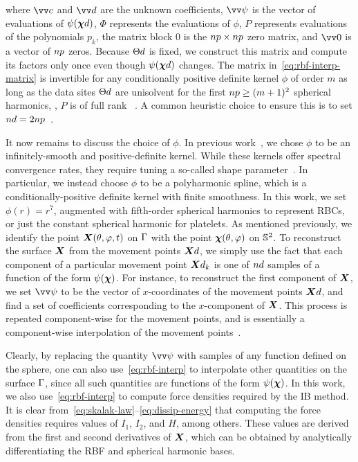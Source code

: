 where $\arr{c}$ and $\arr{d}$ are the unknown coefficients, $\arr{\psi}$ is the vector of evaluations of $\psi(\data\Xp)$, $\Phi$ represents the evaluations of $\phi$, $P$
represents evaluations of the polynomials $p_k$, the matrix block $0$ is the
$\poly\cardinality\times\poly\cardinality$ zero matrix, and $\arr{0}$ is a vector of $\poly\cardinality$ zeros.
Because $\data\sites$ is fixed, we construct this matrix and compute its factors only once even though $\psi(\data\Xp)$
changes. The matrix in~\eqref{eq:rbf-interp-matrix} is invertible for any conditionally positive definite kernel
$\phi$ of order $m$ as long as the data sites $\data\sites$ are unisolvent for the first
$\poly\cardinality \ge (m+1)^2$ spherical harmonics, , $P$ is of full rank~ \cite{Fasshauer:2007ui}. A
common heuristic choice to ensure this is to set $\data\cardinality = 2 \poly\cardinality$~\cite{SWJCP2018}.

It now remains to discuss the choice of $\phi$. In previous work~\cite{Shankar:2015km}, we chose $\phi$ to be an
infinitely-smooth and positive-definite kernel. While these kernels offer spectral convergence rates, they require
tuning a so-called shape parameter~\cite{Fasshauer:2007ui}. In particular, we instead choose $\phi$ to be a
polyharmonic spline, which is a conditionally-positive definite kernel with finite smoothness. In this work,
we set $\phi(r) = r^7$, augmented with fifth-order spherical harmonics to represent RBCs, or just the constant
spherical harmonic for platelets. As mentioned previously, we identify the point $\boldsymbol{X}(\theta, \varphi, t)$ on
$\Gamma$ with the point $\boldsymbol{\chi}(\theta, \varphi)$ on $\mathbb{S}^2$.  To reconstruct the surface $\boldsymbol{X}$ from the
movement points $\data\X$, we simply use the fact that each component of a particular movement point $\data\X_k$
is one of $\data\cardinality$ samples of a function of the form $\psi(\boldsymbol{\chi})$. For instance, to reconstruct the
first component of $\boldsymbol{X}$, we set $\arr{\psi}$ to be the vector of $x$-coordinates of the movement
points $\data\X$, and find a set of coefficients corresponding to the $x$-component of $\boldsymbol{X}$.  This process is
repeated component-wise for the movement points, and is essentially a component-wise interpolation of the movement
points~\cite{Shankar:2015km}.

Clearly, by replacing the quantity $\arr{\psi}$ with samples of any function defined on the sphere, one can also
use~\eqref{eq:rbf-interp} to interpolate other quantities on the surface $\Gamma$, since all such quantities
are functions of the form $\psi(\boldsymbol{\chi})$. In this work, we also use~\eqref{eq:rbf-interp} to compute force densities
required by the IB method. It is clear from~\eqref{eq:skalak-law}--\eqref{eq:dissip-energy} that computing the
force densities requires values of $I_1$, $I_2$, and $H$, among others.  These values are derived from the first
and second derivatives of $\boldsymbol{X}$, which can be obtained by analytically differentiating the RBF and spherical
harmonic bases.

